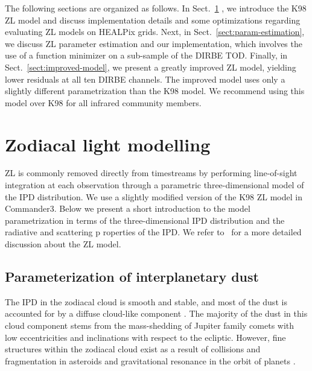 \documentclass[twocolumn]{aa}
\begin{document}
The following sections are organized as follows. In Sect.~\ref{sect:zodi-model}
, we introduce the K98 ZL model and discuss 
implementation details and some optimizations regarding evaluating ZL 
models on HEALPix grids. Next, in Sect.~\ref{sect:param-estimation}, we 
discuss ZL parameter estimation and our implementation, which involves 
the use of a function minimizer on a sub-sample of the DIRBE TOD. 
Finally, in Sect.~\ref{sect:improved-model}, we present a greatly 
improved ZL model, yielding lower residuals at all ten DIRBE channels. 
The improved model uses only a slightly different parametrization than 
the K98 model. We recommend using this model over K98 for all infrared 
community members.


\section{Zodiacal light modelling}\label{sect:zodi-model}
ZL is commonly removed directly from timestreams by performing 
line-of-sight integration at each observation through a parametric 
three-dimensional model of the IPD distribution. We use a slightly 
modified version of the K98 ZL model in Commander3. Below we present a 
short introduction to the model parametrization in terms of the 
three-dimensional IPD distribution and the radiative and scattering p
roperties of the IPD. We refer to~\cite{Kelsall1998} for a more detailed 
discussion about the ZL model.


\subsection{Parameterization of interplanetary dust}
The IPD in the zodiacal cloud is smooth and stable, and most of the dust 
is accounted for by a diffuse cloud-like component \citep{Leinert1998}. 
The majority of the dust in this cloud component stems from the 
mass-shedding of Jupiter family comets with low eccentricities and 
inclinations with respect to the ecliptic. However, fine structures 
within the zodiacal cloud exist as a result of collisions and 
fragmentation in asteroids and gravitational resonance in the orbit of 
planets \citep{Low1984, Dermott1984, Dermott1994, Reach1997}. 
\end{document}
